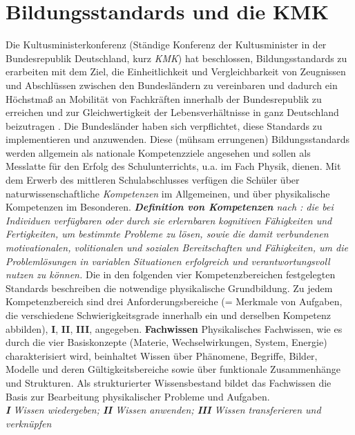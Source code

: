 
\section{Bildungsstandards und die KMK}\label{KmK}
Die Kultusministerkonferenz (Ständige Konferenz der Kultusminister in der Bundesrepublik Deutschland, kurz \emph{KMK}) hat beschlossen, Bildungsstandards zu erarbeiten mit dem Ziel, die Einheitlichkeit und Vergleichbarkeit von Zeugnissen und Abschl{\"u}ssen zwischen den Bundesl{\"a}ndern zu vereinbaren und dadurch ein H{\"o}chstma{\ss} an Mobilit{\"a}t von Fachkr{\"a}ften innerhalb der Bundesrepublik zu erreichen und  zur Gleichwertigkeit der Lebensverh{\"a}ltnisse in ganz Deutschland beizutragen \autocite{KMK}. Die Bundesl{\"a}nder haben sich verpflichtet, diese Standards zu implementieren und anzuwenden. Diese (m{\"u}hsam errungenen) Bildungsstandards werden allgemein als nationale Kompetenzziele angesehen und sollen als Messlatte f{\"u}r den Erfolg des Schulunterrichts, u.a. im Fach Physik, dienen. 
\mip
Mit dem Erwerb des mittleren Schulabschlusses verf{\"u}gen die Schüler {\"u}ber naturwissenschaftliche \emph{Kompetenzen} im Allgemeinen, und {\"u}ber physikalische Kompetenzen im Besonderen. 
\mip
\leftskip=0.5cm \rightskip=0.5cm {\emph{{\textbf{Definition von Kompetenzen}} nach \textcite{Weinert}: die bei Individuen verf{\"u}gbaren oder durch sie erlernbaren kognitiven F{\"a}higkeiten und Fertigkeiten, um bestimmte Probleme zu 
l{\"o}sen, sowie die damit verbundenen motivationalen, volitionalen und sozialen Bereitschaften und F{\"a}higkeiten, um die Probleml{\"o}sungen in variablen Situationen erfolgreich und verantwortungsvoll nutzen zu k{\"o}nnen.}} 
\mip
\leftskip=0cm \rightskip=0cm Die in den folgenden vier Kompetenzbereichen festgelegten Standards beschreiben die notwendige physikalische Grundbildung. Zu jedem Kompetenzbereich sind drei Anforderungsbereiche  (= Merkmale von Aufgaben, die verschiedene Schwierigkeitsgrade innerhalb ein und derselben Kompetenz abbilden), \textbf{I}, \textbf{II}, \textbf{III}, angegeben. 
\mip
{\textbf{Fachwissen}} \tabto{7em} \hangindent=2.7cm Physikalisches Fachwissen, wie es durch die vier Basiskonzepte (Materie, Wechselwirkungen, System, Energie) charakterisiert wird, beinhaltet Wissen {\"u}ber Ph{\"a}nomene, Begriffe, Bilder, Modelle und deren G{\"u}ltigkeitsbereiche sowie {\"u}ber funktionale Zusammenh{\"a}nge und Strukturen. Als strukturierter Wissensbestand bildet das Fachwissen die Basis zur Bearbeitung physikalischer Probleme und Aufgaben. \\ \emph{\textbf{I} Wissen wiedergeben; \textbf{II} Wissen anwenden; \textbf{III} Wissen transferieren und verkn{\"u}pfen}
